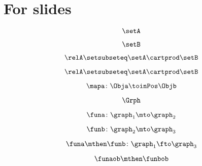 
\section[For slides]{For slides}


\begin{forslides}
  
        \begin{equation}
            \label{eq:00}
            \setA
        \end{equation}

        \begin{equation}
            \label{eq:01}
            \setB
        \end{equation}

        \begin{equation}
            \label{eq:02}
            \relA \setsubseteq \setA \cartprod \setB
        \end{equation}

        \begin{equation}
            \label{eq:03}
            \relA \setsubseteq \setA \cartprod \setB
        \end{equation}

        \begin{equation}
            \label{eq:04}
            \mapa \colon \Obja \toinPos \Objb
        \end{equation}

        \begin{equation}
            \label{eq:05}
            \Grph
        \end{equation}

        \begin{equation}
            \label{eq:06}
            \funa\colon \graph_1\mto \graph_2
        \end{equation}

        \begin{equation}
            \label{eq:07}
            \funb\colon \graph_2\mto \graph_3
        \end{equation}

        \begin{equation}
            \label{eq:08}
            \funa\mthen \funb \colon \graph_1 \fto \graph_3
        \end{equation}

        \begin{equation}
            \label{eq:09}
            \funaob \mthen \funbob
        \end{equation}


\end{forslides}
